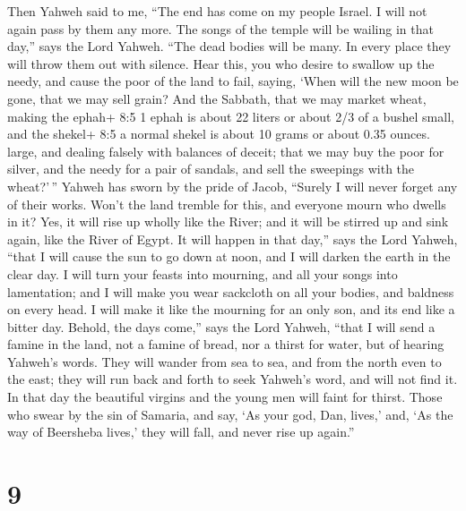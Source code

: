 Then Yahweh said to me, ``The end has come on my people Israel. I will
not again pass by them any more.  The songs of the temple
will be wailing in that day,'' says the Lord Yahweh. ``The dead bodies
will be many. In every place they will throw them out with silence.
 Hear this, you who desire to swallow up the needy, and
cause the poor of the land to fail,  saying, `When will the
new moon be gone, that we may sell grain? And the Sabbath, that we may
market wheat, making the ephah+ 8:5 1 ephah is about 22 liters or about
2/3 of a bushel small, and the shekel+ 8:5 a normal shekel is about 10
grams or about 0.35 ounces. large, and dealing falsely with balances of
deceit;  that we may buy the poor for silver, and the needy
for a pair of sandals, and sell the sweepings with the wheat?'\,''
 Yahweh has sworn by the pride of Jacob, ``Surely I will
never forget any of their works.  Won't the land tremble for
this, and everyone mourn who dwells in it? Yes, it will rise up wholly
like the River; and it will be stirred up and sink again, like the River
of Egypt.  It will happen in that day,'' says the Lord
Yahweh, ``that I will cause the sun to go down at noon, and I will
darken the earth in the clear day.  I will turn your feasts
into mourning, and all your songs into lamentation; and I will make you
wear sackcloth on all your bodies, and baldness on every head. I will
make it like the mourning for an only son, and its end like a bitter
day.  Behold, the days come,'' says the Lord Yahweh, ``that
I will send a famine in the land, not a famine of bread, nor a thirst
for water, but of hearing Yahweh's words.  They will wander
from sea to sea, and from the north even to the east; they will run back
and forth to seek Yahweh's word, and will not find it.  In
that day the beautiful virgins and the young men will faint for thirst.
 Those who swear by the sin of Samaria, and say, `As your
god, Dan, lives,' and, `As the way of Beersheba lives,' they will fall,
and never rise up again.''

\hypertarget{section-8}{%
\section{9}\label{section-8}}

